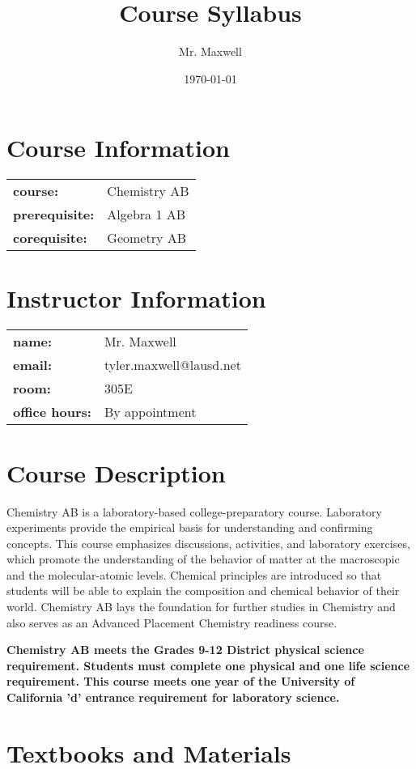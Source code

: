 \documentclass[11pt]{article}
\author{Mr. Maxwell}
\date{\today}
\title{Course Syllabus}
\begin{document}
\maketitle
\tableofcontents

\section{Course Information}
\label{sec:org2c5f558}
\begin{tabular}{ll}
\textbf{course:} & Chemistry AB\\
\textbf{prerequisite:} & Algebra 1 AB\\
\textbf{corequisite:} & Geometry AB\\
\end{tabular}
\section{Instructor Information}
\label{sec:org696f345}
\begin{tabular}{ll}
\textbf{name:} & Mr. Maxwell\\
\textbf{email:} & tyler.maxwell@lausd.net\\
\textbf{room:} & 305E\\
\textbf{office hours:} & By appointment\\
\end{tabular}
\section{Course Description}
\label{sec:org9b8b478}
Chemistry AB is a laboratory-based college-preparatory course. Laboratory experiments provide the empirical basis for understanding and confirming concepts. This course emphasizes discussions, activities, and laboratory exercises, which promote the understanding of the behavior of matter at the macroscopic and the molecular-atomic levels. Chemical principles are introduced so that students will be able to explain the composition and chemical behavior of their world. Chemistry AB lays the foundation for further studies in Chemistry and also serves as an Advanced Placement Chemistry readiness course. 

\textbf{Chemistry AB meets the Grades 9-12 District physical science requirement. Students must complete one physical and one life science requirement. This course meets one year of the University of California 'd' entrance requirement for laboratory science.}
\section{Textbooks and Materials}
\label{sec:org45842bd}
\end{document}
